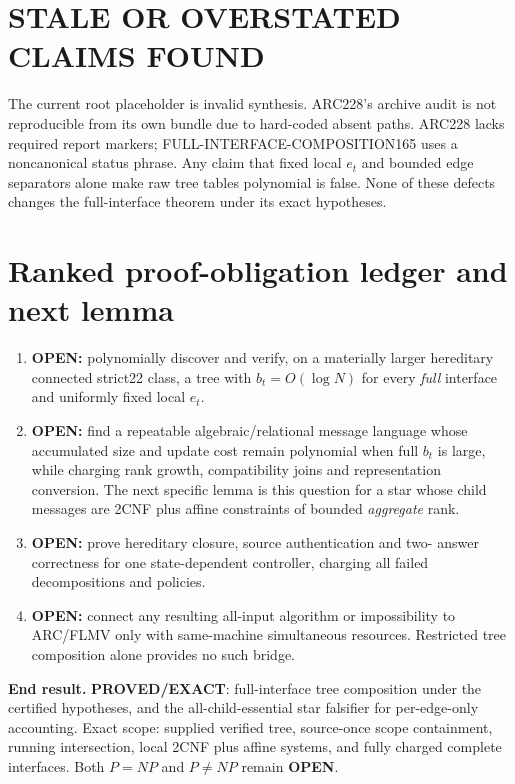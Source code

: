 \documentclass[11pt]{article}
\begin{document}
\section{STALE OR OVERSTATED CLAIMS FOUND}
The current root placeholder is invalid synthesis.  ARC228's archive audit is
not reproducible from its own bundle due to hard-coded absent paths.  ARC228
lacks required report markers; FULL-INTERFACE-COMPOSITION165 uses a noncanonical
status phrase.  Any claim that fixed local $e_t$ and bounded edge separators
alone make raw tree tables polynomial is false.  None of these defects changes
the full-interface theorem under its exact hypotheses.

\section{Ranked proof-obligation ledger and next lemma}
\begin{enumerate}
\item \textbf{OPEN:} polynomially discover and verify, on a materially larger
hereditary connected strict22 class, a tree with $b_t=O(\log N)$ for every
\emph{full} interface and uniformly fixed local $e_t$.
\item \textbf{OPEN:} find a repeatable algebraic/relational message language
whose accumulated size and update cost remain polynomial when full $b_t$ is
large, while charging rank growth, compatibility joins and representation
conversion.  The next specific lemma is this question for a star whose child
messages are 2CNF plus affine constraints of bounded \emph{aggregate} rank.
\item \textbf{OPEN:} prove hereditary closure, source authentication and two-
answer correctness for one state-dependent controller, charging all failed
decompositions and policies.
\item \textbf{OPEN:} connect any resulting all-input algorithm or impossibility
to ARC/FLMV only with same-machine simultaneous resources.  Restricted tree
composition alone provides no such bridge.
\end{enumerate}

\textbf{End result.} \textbf{PROVED/EXACT}: full-interface tree composition
under the certified hypotheses, and the all-child-essential star falsifier for
per-edge-only accounting.  Exact scope: supplied verified tree, source-once
scope containment, running intersection, local 2CNF plus affine systems, and
fully charged complete interfaces.  Both $P=NP$ and $P\ne NP$ remain
\textbf{OPEN}.
\end{document}
